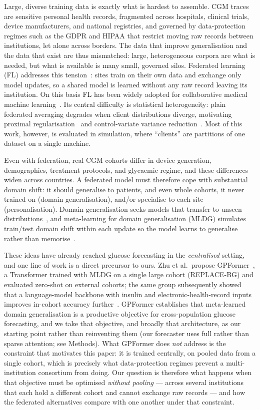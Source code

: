 \documentclass[10pt,letterpaper]{article}
\begin{document}
Large, diverse training data is exactly what is hardest to assemble. CGM traces
are sensitive personal health records, fragmented across hospitals, clinical
trials, device manufacturers, and national registries, and governed by
data-protection regimes such as the GDPR and HIPAA that restrict moving raw
records between institutions, let alone across borders. The data that improve
generalisation and the data that exist are thus mismatched: large, heterogeneous
corpora are what is needed, but what is available is many small, governed silos.
Federated learning (FL) addresses this tension~\cite{mcmahan2017fedavg}: sites
train on their own data and exchange only model updates, so a shared model is
learned without any raw record leaving its institution. On this basis FL has been
widely adopted for collaborative medical machine
learning~\cite{rieke2020future,sheller2020federated,kaissis2020secure}. Its
central difficulty is statistical heterogeneity: plain federated averaging
degrades when client distributions diverge, motivating proximal
regularisation~\cite{li2020fedprox} and control-variate variance
reduction~\cite{karimireddy2020scaffold}. Most of this work, however, is evaluated
in simulation, where ``clients'' are partitions of one dataset on a single
machine.

Even with federation, real CGM cohorts differ in device generation, demographics,
treatment protocols, and glycaemic regime, and these differences widen across
countries. A federated model must therefore cope with substantial domain shift: it
should generalise to patients, and even whole cohorts, it never trained on (domain
generalisation), and/or specialise to each site (personalisation). Domain
generalisation seeks models that transfer to unseen
distributions~\cite{zhou2022dgsurvey}, and meta-learning for domain generalisation
(MLDG) simulates train/test domain shift within each update so the model learns to
generalise rather than memorise~\cite{li2018mldg}.

These ideas have already reached glucose forecasting in the \emph{centralised}
setting, and one line of work is a direct precursor to ours. Zhu et al.\ propose
GPFormer~\cite{zhu2024gpformer}, a Transformer trained with MLDG on a single large
cohort (REPLACE-BG) and evaluated zero-shot on external cohorts; the same group
subsequently showed that a language-model backbone with insulin and
electronic-health-record inputs improves in-cohort accuracy
further~\cite{zhu2026glullm}. GPFormer establishes that meta-learned domain
generalisation is a productive objective for cross-population glucose forecasting,
and we take that objective, and broadly that architecture, as our starting point
rather than reinventing them (our forecaster uses full rather than sparse
attention; see Methods). What GPFormer does \emph{not} address is the constraint
that motivates this paper: it is trained centrally, on pooled data from a single
cohort, which is precisely what data-protection regimes prevent a
multi-institution consortium from doing. Our question is therefore what happens when that objective must be
optimised \emph{without pooling} --- across several institutions that each hold a
different cohort and cannot exchange raw records --- and how the federated
alternatives compare with one another under that constraint.
\end{document}
